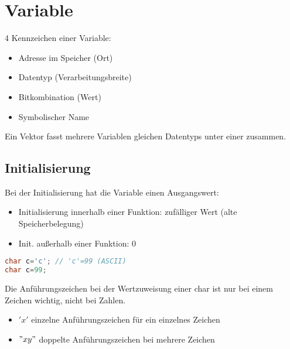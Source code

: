 \documentclass{scrreprt}
\begin{document}
\section{Variable}
4 Kennzeichen einer Variable:
\begin{itemize}
\item Adresse im Speicher (Ort)
\item Datentyp (Verarbeitungsbreite)
\item Bitkombination (Wert)
\item Symbolischer Name
\end{itemize}
Ein Vektor fasst mehrere Variablen gleichen Datentyps unter einer zusammen.

\subsection{Initialisierung}
Bei der Initialisierung hat die Variable einen Ausgangswert:
\begin{itemize}
\item Initialisierung innerhalb einer Funktion: zufälliger Wert (alte Speicherbelegung)
\item Init. außerhalb einer Funktion: 0
\end{itemize}

\begin{lstlisting}[language=C]
char c='c';	// 'c'=99 (ASCII)
char c=99;
\end{lstlisting}
Die Anführungszeichen bei der Wertzuweisung einer char ist nur bei einem Zeichen wichtig, nicht bei Zahlen.
\begin{itemize}
\item $'x'$ einzelne Anführungszeichen für ein einzelnes Zeichen
\item $"xy"$ doppelte Anführungszeichen bei mehrere Zeichen
\end{itemize}
\end{document}
